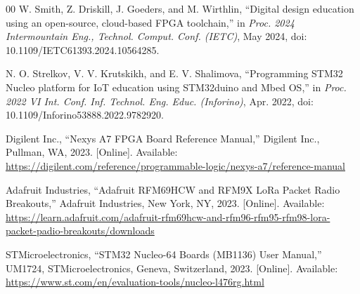 \documentclass[conference]{IEEEtran}
\begin{document}
\begin{thebibliography}{00}
W. Smith, Z. Driskill, J. Goeders, and M. Wirthlin, ``Digital design education using an open-source, cloud-based FPGA toolchain,'' in \textit{Proc. 2024 Intermountain Eng., Technol. Comput. Conf. (IETC)}, May 2024, doi: 10.1109/IETC61393.2024.10564285. %

N. O. Strelkov, V. V. Krutskikh, and E. V. Shalimova, ``Programming STM32 Nucleo platform for IoT education using STM32duino and Mbed OS,'' in \textit{Proc. 2022 VI Int. Conf. Inf. Technol. Eng. Educ. (Inforino)}, Apr. 2022, doi: 10.1109/Inforino53888.2022.9782920. %

Digilent Inc., ``Nexys A7 FPGA Board Reference Manual,'' Digilent Inc., Pullman, WA, 2023. [Online]. Available: \url{https://digilent.com/reference/programmable-logic/nexys-a7/reference-manual} %

Adafruit Industries, ``Adafruit RFM69HCW and RFM9X LoRa Packet Radio Breakouts,'' Adafruit Industries, New York, NY, 2023. [Online]. Available: \url{https://learn.adafruit.com/adafruit-rfm69hcw-and-rfm96-rfm95-rfm98-lora-packet-padio-breakouts/downloads} %

STMicroelectronics, ``STM32 Nucleo-64 Boards (MB1136) User Manual,'' UM1724, STMicroelectronics, Geneva, Switzerland, 2023. [Online]. Available: \url{https://www.st.com/en/evaluation-tools/nucleo-l476rg.html} %

\end{thebibliography}
\end{document}
